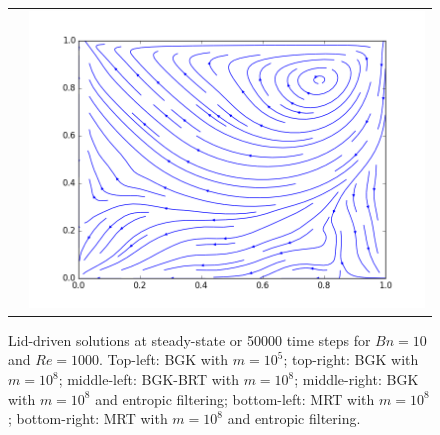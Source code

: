 \begin{figure}
\begin{tabulary}{\linewidth}{c c}
		&
		\includegraphics[width=\figwid]{figs/lid/bingham_100_mrt-filter_Bn10_Re1000/sl_step-000050000}
	\end{tabulary}
	\caption{Lid-driven solutions at steady-state or 50000 time steps for $Bn = 10$ and $Re = 1000$. Top-left: BGK with $m = 10^5$; top-right: BGK with $m = 10^8$; middle-left: BGK-BRT with $m = 10^8$; middle-right: BGK with $m = 10^8$ and entropic filtering; bottom-left: MRT with $m = 10^8$; bottom-right: MRT with $m = 10^8$ and entropic filtering.}
	\label{fig:lid-Bn10-Re1000}
\end{figure}

